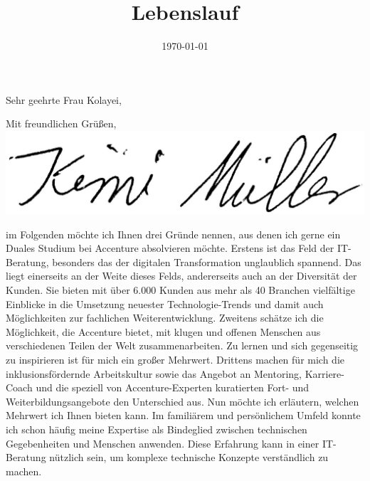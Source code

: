 \documentclass[11pt,a4paper,sans]{moderncv}        %
\title{Lebenslauf}                               %
\begin{document}
\date{\today}
\subject{Bewerbung um ein Duales Studium der Wirtschaftsinformatik}
\opening{Sehr geehrte Frau Kolayei,}
\closing{Mit freundlichen Grüßen,\\ \includegraphics[scale=0.4]{images/Unterschrift2.png}}
\makelettertitle
im Folgenden möchte ich Ihnen drei Gründe nennen, aus denen ich gerne ein Duales Studium bei Accenture absolvieren möchte.\newline \newline
Erstens ist das Feld der IT-Beratung, besonders das der digitalen Transformation unglaublich spannend. Das liegt einerseits an der Weite dieses Felds, andererseits auch an der Diversität der Kunden. Sie bieten mit über 6.000 Kunden aus mehr als 40 Branchen vielfältige Einblicke in die Umsetzung neuester Technologie-Trends und damit auch Möglichkeiten zur fachlichen Weiterentwicklung.\newline \newline
Zweitens schätze ich die Möglichkeit, die Accenture bietet, mit klugen und offenen Menschen aus verschiedenen Teilen der Welt zusammenarbeiten. Zu lernen und sich gegenseitig zu inspirieren ist für mich ein großer Mehrwert.\newline \newline
Drittens machen für mich die inklusionsfördernde Arbeitskultur sowie das Angebot an Mentoring, Karriere-Coach und die speziell von Accenture-Experten kuratierten Fort- und Weiterbildungsangebote den Unterschied aus.\newline \newline
Nun möchte ich erläutern, welchen Mehrwert ich Ihnen bieten kann.\newline \newline
Im familiärem und persönlichem Umfeld konnte ich schon häufig meine Expertise als Bindeglied zwischen technischen Gegebenheiten und Menschen anwenden. Diese Erfahrung kann in einer IT-Beratung nützlich sein, um komplexe technische Konzepte verständlich zu machen.\newline \newline
\end{document}
